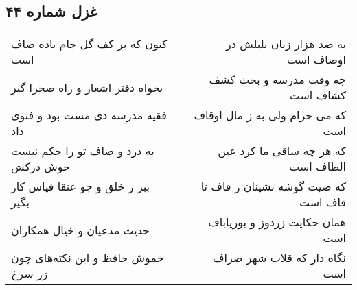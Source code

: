\begin{center}
\section*{غزل شماره ۴۴}
\label{sec:sh044}
\begin{longtable}{l p{0.5cm} r}
کنون که بر کف گل جام باده صاف است
&&
به صد هزار زبان بلبلش در اوصاف است
\\
بخواه دفتر اشعار و راه صحرا گیر
&&
چه وقت مدرسه و بحث کشف کشاف است
\\
فقیه مدرسه دی مست بود و فتوی داد
&&
که می حرام ولی به ز مال اوقاف است
\\
به درد و صاف تو را حکم نیست خوش درکش
&&
که هر چه ساقی ما کرد عین الطاف است
\\
ببر ز خلق و چو عنقا قیاس کار بگیر
&&
که صیت گوشه نشینان ز قاف تا قاف است
\\
حدیث مدعیان و خیال همکاران
&&
همان حکایت زردوز و بوریاباف است
\\
خموش حافظ و این نکته‌های چون زر سرخ
&&
نگاه دار که قلاب شهر صراف است
\\
\end{longtable}
\end{center}
